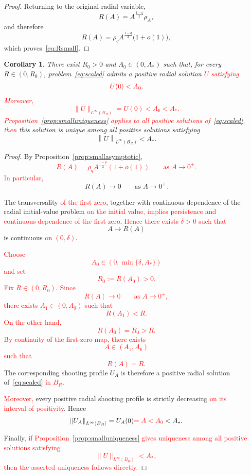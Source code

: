 \documentclass[11pt]{article}
\newcommand{\norm}[1]{\left\|#1\right\|}
\newtheorem{corollary}[theorem]{Corollary}
\theoremstyle{definition}
\begin{document}
\begin{proof}
Returning to the original radial variable,
\[
R(A)
=
A^{\frac{1-q}{2}}\rho_A,
\]
and therefore
\[
R(A)
=
\rho_q A^{\frac{1-q}{2}}
\bigl(1+o(1)\bigr),
\]
which proves~\eqref{eq:Rsmall}.
\end{proof}


\begin{corollary}
\label{cor:smallbranch}
There exist $R_0>0$ and $A_0\in(0,A_*)$ such that, for every
$R\in(0,R_0)$, problem~\eqref{eq:scaled} admits a positive radial
solution \textcolor{red}{$U$ satisfying}
\[
\textcolor{red}{U(0)<A_0.}
\]
\textcolor{red}{Moreover,
\[
\|U\|_{L^\infty(B_R)}=U(0)<A_0<A_*.
\]}
\textcolor{red}{Proposition~\ref{prop:smalluniqueness} applies to
all positive solutions of~\eqref{eq:scaled}, then} this solution is
unique among all positive solutions satisfying
\[
\norm{U}_{L^\infty(B_R)}<A_*.
\]
\end{corollary}

\begin{proof}
By Proposition~\ref{prop:smallasymptotic},
\textcolor{red}{
\[
R(A)
=
\rho_q A^{\frac{1-q}{2}}(1+o(1))
\qquad\text{as }A\to0^+.
\]
In particular,}
\[
R(A)\to0
\qquad\text{as }A\to0^+.
\]

The transversality \textcolor{red}{of the first zero}, together with
continuous dependence of the radial initial-value problem
\textcolor{red}{on the initial value, implies persistence and
continuous dependence of the first zero. Hence there exists
$\delta>0$ such that}
\[
A\longmapsto R(A)
\]
is continuous \textcolor{red}{on $(0,\delta)$}.

\textcolor{red}{Choose
\[
A_0\in(0,\min\{\delta,A_*\})
\]
and set
\[
R_0:=R(A_0)>0.
\]
Fix $R\in(0,R_0)$. Since
\[
R(A)\to0
\qquad\text{as }A\to0^+,
\]
there exists $A_1\in(0,A_0)$ such that
\[
R(A_1)<R.
\]
On the other hand,
\[
R(A_0)=R_0>R.
\]
By continuity of the first-zero map, there exists
\[
A\in(A_1,A_0)
\]
such that
\[
R(A)=R.
\]}
The corresponding shooting profile $U_A$ is therefore a positive
radial solution of~\eqref{eq:scaled}
\textcolor{red}{in $B_R$}.

\textcolor{red}{Moreover,} every positive radial shooting profile is
strictly decreasing \textcolor{red}{on its interval of positivity}.
Hence
\[
\norm{U_A}_{L^\infty(B_R)}
=
U_A(0)
\textcolor{red}{=A<A_0}<A_*.
\]

Finally, \textcolor{red}{if Proposition~\ref{prop:smalluniqueness}
gives uniqueness among all positive solutions satisfying
\[
\|U\|_{L^\infty(B_R)}<A_*,
\]
then the asserted uniqueness follows directly.}
\end{proof}
\end{document}

